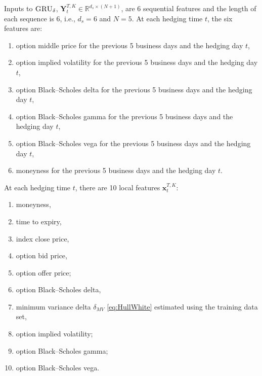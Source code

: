 \documentclass[letterpaper,12pt,titlepage,oneside,final]{book}
\numberwithin{equation}{section}
\theoremstyle{definition}
\newcommand{\model}{\textsc{GRU}_\delta}
\newcommand{\vx}{\mathbf{x}}
\newcommand{\Real}{\mathbb{R}}
\begin{document}
Inputs to $\model$, $\mathbf{Y}_{t}^{T,K} \in \Real^{d_s \times (N+1)}$, are  6  sequential features and the length of each sequence is 6, i.e., $d_s=6$ and $N=5$.  At each hedging time $t$, the six features are:
\begin{enumerate}
	\item  option middle price  for the previous 5 business days and the hedging day $t$,

	\item  option implied volatility  for the previous 5 business days and the hedging day $t$,
	\item  option  Black–Scholes delta  for the previous 5 business days and the hedging day $t$,
	\item  option Black–Scholes gamma  for the previous 5 business days and the hedging day $t$,
	\item  option Black–Scholes vega  for the previous 5 business days and the hedging day $t$,
	\item  moneyness  for the previous 5 business days and the hedging day $t$.
\end{enumerate}
 At each hedging time $t$, there are 10 local features  $\vx_{t}^{T,K}$:
\begin{enumerate}
	\item moneyness,
	
	\item time to expiry,
	\item index close price,
	\item option bid price,
	\item option offer price;
\item option Black–Scholes delta,
\item minimum variance delta $\delta_{MV}$  \eqref{eq:HullWhite} estimated using
the training data set,
	\item option implied volatility;
	\item option Black–Scholes gamma;
	\item option Black–Scholes vega.
\end{enumerate}
\end{document}
